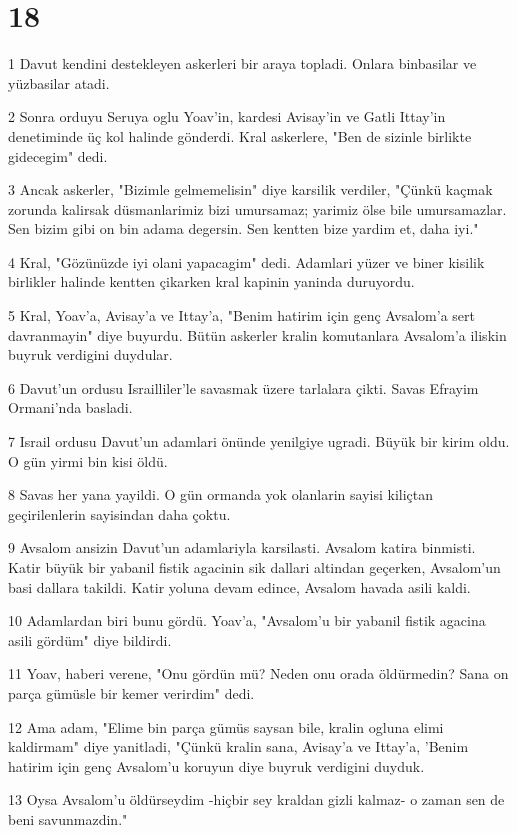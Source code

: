 \chapter{18}

\par 1 Davut kendini destekleyen askerleri bir araya topladi. Onlara binbasilar ve yüzbasilar atadi.
\par 2 Sonra orduyu Seruya oglu Yoav'in, kardesi Avisay'in ve Gatli Ittay'in denetiminde üç kol halinde gönderdi. Kral askerlere, "Ben de sizinle birlikte gidecegim" dedi.
\par 3 Ancak askerler, "Bizimle gelmemelisin" diye karsilik verdiler, "Çünkü kaçmak zorunda kalirsak düsmanlarimiz bizi umursamaz; yarimiz ölse bile umursamazlar. Sen bizim gibi on bin adama degersin. Sen kentten bize yardim et, daha iyi."
\par 4 Kral, "Gözünüzde iyi olani yapacagim" dedi. Adamlari yüzer ve biner kisilik birlikler halinde kentten çikarken kral kapinin yaninda duruyordu.
\par 5 Kral, Yoav'a, Avisay'a ve Ittay'a, "Benim hatirim için genç Avsalom'a sert davranmayin" diye buyurdu. Bütün askerler kralin komutanlara Avsalom'a iliskin buyruk verdigini duydular.
\par 6 Davut'un ordusu Israilliler'le savasmak üzere tarlalara çikti. Savas Efrayim Ormani'nda basladi.
\par 7 Israil ordusu Davut'un adamlari önünde yenilgiye ugradi. Büyük bir kirim oldu. O gün yirmi bin kisi öldü.
\par 8 Savas her yana yayildi. O gün ormanda yok olanlarin sayisi kiliçtan geçirilenlerin sayisindan daha çoktu.
\par 9 Avsalom ansizin Davut'un adamlariyla karsilasti. Avsalom katira binmisti. Katir büyük bir yabanil fistik agacinin sik dallari altindan geçerken, Avsalom'un basi dallara takildi. Katir yoluna devam edince, Avsalom havada asili kaldi.
\par 10 Adamlardan biri bunu gördü. Yoav'a, "Avsalom'u bir yabanil fistik agacina asili gördüm" diye bildirdi.
\par 11 Yoav, haberi verene, "Onu gördün mü? Neden onu orada öldürmedin? Sana on parça gümüsle bir kemer verirdim" dedi.
\par 12 Ama adam, "Elime bin parça gümüs saysan bile, kralin ogluna elimi kaldirmam" diye yanitladi, "Çünkü kralin sana, Avisay'a ve Ittay'a, 'Benim hatirim için genç Avsalom'u koruyun diye buyruk verdigini duyduk.
\par 13 Oysa Avsalom'u öldürseydim -hiçbir sey kraldan gizli kalmaz- o zaman sen de beni savunmazdin."
